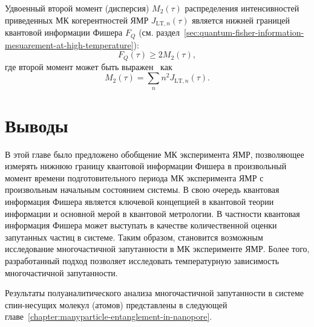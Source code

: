 Удвоенный второй момент (дисперсия) $M_2(\tau)$ распределения интенсивностей приведенных МК когерентностей ЯМР $J_{\mathrm{LT}, n} (\tau)$
является нижней границей квантовой информации Фишера $F_{Q}$
(см. раздел~\ref{sec:quantum-fisher-information-mesuarement-at-high-temperature}):
\begin{equation}\label{eq:fisher-low-bound}
  F_{Q}(\tau) \geq 2M_2(\tau),
\end{equation}
где второй момент может быть выражен~\cite{Khitrin1997} как
%
\begin{equation}\label{eq:m2-via-coherences}
  M_2(\tau) = \sum\limits_n n^2 J_{\mathrm{LT}, n} (\tau).
\end{equation}

\section{Выводы}
В этой главе было предложено обобщение МК эксперимента ЯМР,
позволяющее измерять нижнюю границу квантовой информации Фишера
в произвольный момент времени подготовительного периода МК эксперимента ЯМР
с произвольным начальным состоянием системы.
В свою очередь квантовая информация Фишера является ключевой концепцией в квантовой теории информации
и основной мерой в квантовой метрологии.
В частности квантовая информация Фишера может выступать в качестве количественной оценки запутанных частиц в системе.
Таким образом, становится возможным исследование многочастичной запутанности в МК эксперименте ЯМР.
Более того, разработанный подход позволяет исследовать температурную зависимость многочастичной запутанности.

Результаты полуаналитического анализа многочастичной запутанности в системе спин-несущих молекул (атомов) представлены в следующей главе~\ref{chapter:manyparticle-entanglement-in-nanopore}.